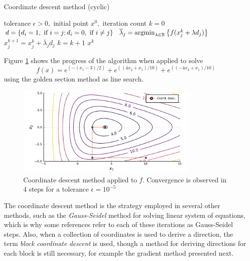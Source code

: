 \begin{algorithm}[h]
\caption{Coordinate descent method (cyclic)} \label{Alg5}
\begin{algorithmic}[1] %
 tolerance $\epsilon > 0,$ initial point $x^0,$ iteration count $k = 0$ 
     \label{alg5:line3}
        \State $d =\left\{ d_i = 1, \text{ if } i=j; d_i = 0, \text{ if } i \neq j \right \}$
        \State $\overline{\lambda}_j = \mathop{\rm argmin}_{\lambda \in \mathbb{R}}\left\{ f(x_j^k + \lambda d_j) \right \}$
        \State $x^{k+1}_j = x^k_j + \overline{\lambda}_j  d_j$
    \EndFor
    \State $k = k+1$
\EndWhile
{} $x^k$
\end{algorithmic}
\end{algorithm}

Figure \ref{fig:coordinate_descent} shows the progress of the algorithm when applied to solve 
$$f(x)=e^{(-(x_1-3)/2)} + e^{((4x_2 + x_1)/10)} + e^{((-4x_2 + x_1)/10)}$$ using the golden section method as line search. 

\begin{figure}[h]
\includegraphics[width=0.8\textwidth]{part_2/chapter_5/figures/coordinate_decent_exact.pdf}	
\caption{Coordinate descent method applied to $f$. Convergence is observed in 4 steps for a tolerance $\epsilon = 10^{-5}$} \label{fig:coordinate_descent}
\end{figure}

The coordinate descent method is the strategy employed in several other methods, such as the \emph{Gauss-Seidel} method for solving linear system of equations, which is why some references refer to each of these iterations as Gauss-Seidel steps. Also, when a collection of coordinates is used to derive a direction, the term \emph{block coordinate descent} is used, though a method for deriving directions for each block is still necessary, for example the gradient method presented next.  


